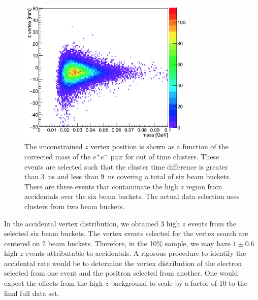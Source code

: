 \begin{figure}[htb]
  \centering
      \includegraphics[width=0.75\textwidth]{pics/searching/zVm_acc_L1L1.png}
  \caption[Vertex position vs mass for the 10$\%$ L1L1 accidentals]{The unconstrained $z$ vertex position is shown as a function of the corrected mass of the $e^+e^-$ pair for out of time clusters. These events are selected such that the cluster time difference is greater than 3~ns and less than 9~ns covering a total of six beam buckets. There are three events that contaminate the high $z$ region from accidentals over the six beam buckets. The actual data selection uses clusters from two beam buckets.}
  \label{fig:zVm_acc}
\end{figure} 

In the accidental vertex distribution, we obtained 3 high $z$ events from the selected six beam buckets. The vertex events selected for the vertex search are centered on 2 beam buckets. Therefore, in the 10$\%$ sample, we may have $1\pm0.6$ high $z$ events attributable to accidentals. A rigorous procedure to identify the accidental rate would be to determine the vertex distribution of the electron selected from one event and the positron selected from another. One would expect the effects from the high $z$ background to scale by a factor of 10 to the final full data set. 